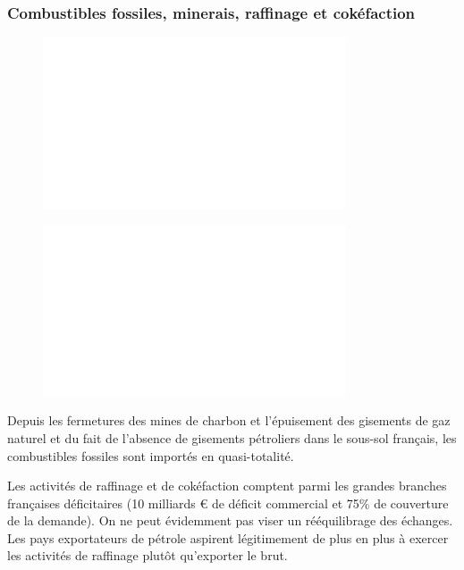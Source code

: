 \documentclass[a4paper]{article}
\begin{document}
\subsubsection{Combustibles fossiles, minerais, raffinage et cokéfaction}

\begin{figure}[H]
    \centering
    \includegraphics*[width=0.8\textwidth]{images/solde6}
    \label{fig:couverture}
\end{figure}

\begin{figure}[H]
    \centering
    \includegraphics*[width=0.8\textwidth]{images/etp6}
    \label{fig:couverture}
\end{figure}

Depuis les fermetures des mines de charbon et l’épuisement des gisements de gaz naturel et du fait de l’absence de gisements pétroliers dans le sous-sol français, les combustibles fossiles sont importés en quasi-totalité. 

Les activités de raffinage et de cokéfaction comptent parmi les grandes branches françaises déficitaires (10 milliards € de déficit commercial et 75\% de couverture de la demande). On ne peut évidemment pas viser un rééquilibrage des échanges.  Les pays exportateurs de pétrole aspirent légitimement de plus en plus à exercer les activités de raffinage plutôt qu’exporter le brut. 
\end{document}
